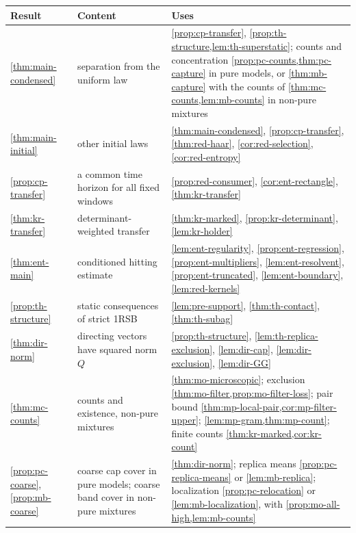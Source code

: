 \begin{table}[ht]
\centering
\footnotesize
\begin{tabular}{@{}>{\raggedright\arraybackslash}p{}>{\raggedright\arraybackslash}p{}>{\raggedright\arraybackslash}p{}@{}}
\toprule
Result & Content & Uses\\
\midrule
\cref{thm:main-condensed} & separation from the uniform law & \cref{prop:cp-transfer}, \cref{prop:th-structure,lem:th-superstatic}; counts and concentration \cref{prop:pc-counts,thm:pc-capture} in pure models, or \cref{thm:mb-capture} with the counts of \cref{thm:mc-counts,lem:mb-counts} in non-pure mixtures\\
\cref{thm:main-initial} & other initial laws & \cref{thm:main-condensed}, \cref{prop:cp-transfer}, \cref{thm:red-haar}, \cref{cor:red-selection}, \cref{cor:red-entropy}\\
\cref{prop:cp-transfer} & a common time horizon for all fixed windows & \cref{prop:red-consumer}, \cref{cor:ent-rectangle}, \cref{thm:kr-transfer}\\
\cref{thm:kr-transfer} & determinant-weighted transfer & \cref{thm:kr-marked}, \cref{prop:kr-determinant}, \cref{lem:kr-holder}\\
\cref{thm:ent-main} & conditioned hitting estimate & \cref{lem:ent-regularity}, \cref{prop:ent-regression}, \cref{prop:ent-multipliers}, \cref{lem:ent-resolvent}, \cref{prop:ent-truncated}, \cref{lem:ent-boundary}, \cref{lem:red-kernels}\\
\cref{prop:th-structure} & static consequences of strict 1RSB & \cref{lem:pre-support}, \cref{thm:th-contact}, \cref{thm:th-subag}\\
\cref{thm:dir-norm} & directing vectors have squared norm $Q$ & \cref{prop:th-structure}, \cref{lem:th-replica-exclusion}, \cref{lem:dir-cap}, \cref{lem:dir-exclusion}, \cref{lem:dir-GG}\\
\cref{thm:mc-counts} & counts and existence, non-pure mixtures & \cref{thm:mo-microscopic}; exclusion \cref{thm:mo-filter,prop:mo-filter-loss}; pair bound \cref{thm:mp-local-pair,cor:mp-filter-upper}; \cref{lem:mp-gram,thm:mp-count}; finite counts \cref{thm:kr-marked,cor:kr-count}\\
\cref{prop:pc-coarse}, \cref{prop:mb-coarse} & coarse cap cover in pure models; coarse band cover in non-pure mixtures & \cref{thm:dir-norm}; replica means \cref{prop:pc-replica-means} or \cref{lem:mb-replica}; localization \cref{prop:pc-relocation} or \cref{lem:mb-localization}, with \cref{prop:mo-all-high,lem:mb-counts}\\

\end{tabular}
\end{table}
